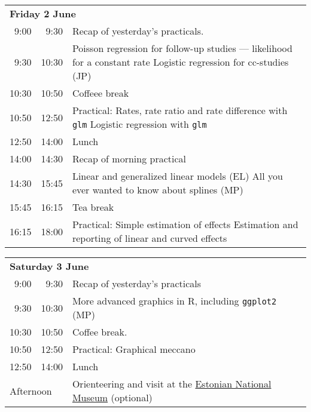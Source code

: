 \noindent
\begin{tabular}{r@{ -- }rp{13cm}}
\multicolumn{3}{l}{\bf Friday 2 June} \\
 9:00 &  9:30 & Recap of yesterday's practicals. \\
 9:30 & 10:30 & Poisson regression for follow-up studies ---
                likelihood for a constant rate \newline
                Logistic regression for cc-studies (JP) \\
10:30 & 10:50 & Coffeee break \\
10:50 & 12:50 & Practical: Rates, rate ratio and rate difference with \texttt{glm}\newline
                Logistic regression with \texttt{glm} \\
12:50 & 14:00 & Lunch \\
14:00 & 14:30 & Recap of morning practical \\
14:30 & 15:45 & Linear and generalized linear models (EL) \newline
                All you ever wanted to know about splines (MP) \\
15:45 & 16:15 & Tea break\\
16:15 & 18:00 & Practical: Simple estimation of effects \newline
                Estimation and reporting of linear and curved effects \\
\end{tabular}

\noindent
\begin{tabular}{r@{ -- }rp{13cm}}
 \multicolumn{3}{l}{\bf Saturday 3 June} \\
 9:00 &  9:30 & Recap of yesterday's practicals \\
 9:30 & 10:30 & More advanced graphics in R, including \texttt{ggplot2} (MP)\\
10:30 & 10:50 & Coffee break. \\
10:50 & 12:50 & Practical: Graphical meccano \\
12:50 & 14:00 & Lunch\\
\multicolumn{2}{l}{Afternoon}
              & Orienteering and visit at the 
\href{https://www.google.dk/maps/place/Estonian+National+Museum/@58.395294,26.7355243,15z/data=!4m5!3m4!1s0x46eb371e0069d991:0x3b484674469f1cea!8m2!3d58.395294!4d26.744279?hl=en}{Estonian National Museum} (optional)\\[2em]
\end{tabular}

